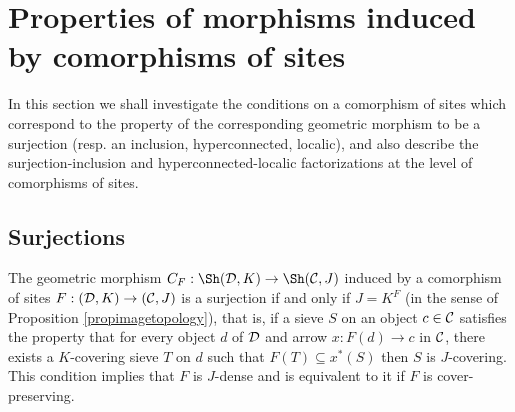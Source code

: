 \documentclass[a4paper,12pt]{article}
\begin{document}
\section{Properties of morphisms induced by comorphisms of sites}\label{sec:comorphismsofsites}

In this section we shall investigate the conditions on a comorphism of sites which correspond to the property of the corresponding geometric morphism to be a surjection (resp. an inclusion, hyperconnected, localic), and also describe the surjection-inclusion and hyperconnected-localic factorizations at the level of comorphisms of sites. 

\subsection{Surjections}\label{sec:surjectionscomorphisms}

\begin{proposition}\label{propsurjectioncomorphismofsites}
The geometric morphism $C_{F}:\Sh({\cal D}, K)\to \Sh({\cal C}, J)$ induced by a comorphism of sites $F:({\cal D}, K)\to ({\cal C}, J)$ is a surjection if and only if $J=K^{F}$ (in the sense of Proposition \ref{propimagetopology}), that is, if a sieve $S$ on an object $c\in {\cal C}$ satisfies the property that for every object $d$ of $\cal D$ and arrow $x:F(d)\to c$ in $\cal C$, there exists a $K$-covering sieve $T$ on $d$ such that $F(T)\subseteq x^{\ast}(S)$ then $S$ is $J$-covering. This condition implies that $F$ is $J$-dense and is equivalent to it if $F$ is cover-preserving.	
\end{proposition}
\end{document}

